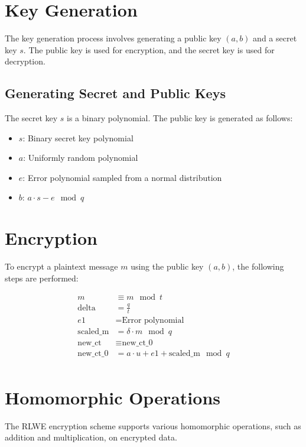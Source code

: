 \documentclass{article}
\begin{document}
\section{Key Generation}

The key generation process involves generating a public key $(a, b)$ and a secret key $s$. The public key is used for encryption, and the secret key is used for decryption.

\subsection{Generating Secret and Public Keys}

The secret key $s$ is a binary polynomial. The public key is generated as follows:

\begin{itemize}
    \item $s$: Binary secret key polynomial
    \item $a$: Uniformly random polynomial
    \item $e$: Error polynomial sampled from a normal distribution
    \item $b$: $a \cdot s - e \mod q$
\end{itemize}

\section{Encryption}

To encrypt a plaintext message $m$ using the public key $(a, b)$, the following steps are performed:

\begin{align*}
    m &\equiv m \mod t \\
    \text{delta} &= \frac{q}{t} \\
    e1 &= \text{Error polynomial} \\
    \text{scaled\_m} &= \delta \cdot m \mod q \\
    \text{new\_ct} &\equiv \text{new\_ct\_0} \\
    \text{new\_ct\_0} &= a \cdot u + e1 + \text{scaled\_m} \mod q \\
\end{align*}

\section{Homomorphic Operations}

The RLWE encryption scheme supports various homomorphic operations, such as addition and multiplication, on encrypted data.
\end{document}
